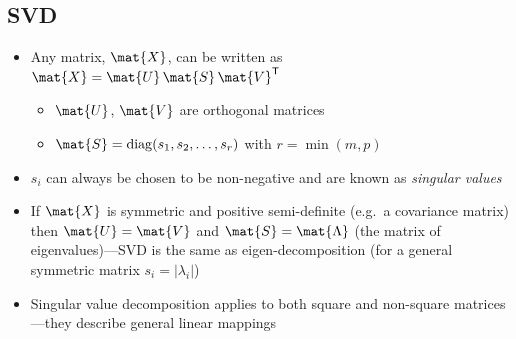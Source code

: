 \begin{slide}
\section[-1]{SVD}

\begin{PauseHighLight}
  \begin{itemize}
  \item Any matrix, $\mat{X}$, can be written as $\mat{X} =
    \mat{U}\,\mat{S}\,\mat{V}^\tr$
    \begin{itemize}
    \item $\mat{U}$, $\mat{V}$ are orthogonal matrices
    \item $\mat{S} = \mathrm{diag}(s_1, s_2,\ldots,s_r)$ with
      $r = \min(m,p)$\pause
    \end{itemize}
  \item $s_i$ can always be chosen to be non-negative and are known as
    \emph{singular values}\pause
  \item If $\mat{X}$ is symmetric and positive semi-definite (e.g.\ a
    covariance matrix) then $\mat{U} = \mat{V}$ and
    $\mat{S} = \mat{\Lambda}$ (the matrix of
    eigenvalues)\pause---SVD is the same as eigen-decomposition\pauseb{}
    (for a general symmetric matrix $s_i = |\lambda_i|$)\pauseb
  \item Singular value decomposition applies to both square and
    non-square matrices---they describe general linear mappings\pause
  \end{itemize}
\end{PauseHighLight}

\end{slide}


